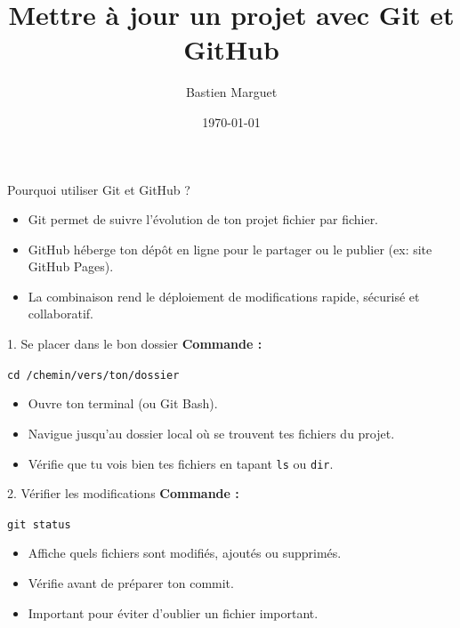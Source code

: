 \documentclass{beamer}
\title{Mettre à jour un projet avec Git et GitHub}
\author{Bastien Marguet}
\date{\today}
\begin{document}
	
	\begin{frame}
		\titlepage
	\end{frame}
	
	\begin{frame}{Pourquoi utiliser Git et GitHub ?}
		\begin{itemize}
			\item Git permet de suivre l’évolution de ton projet fichier par fichier.
			\item GitHub héberge ton dépôt en ligne pour le partager ou le publier (ex: site GitHub Pages).
			\item La combinaison rend le déploiement de modifications rapide, sécurisé et collaboratif.
		\end{itemize}
	\end{frame}
	
	\begin{frame}{1. Se placer dans le bon dossier}
		\textbf{Commande :}
		\begin{block}{}
			\texttt{cd /chemin/vers/ton/dossier}
		\end{block}
		\begin{itemize}
			\item Ouvre ton terminal (ou Git Bash).
			\item Navigue jusqu’au dossier local où se trouvent tes fichiers du projet.
			\item Vérifie que tu vois bien tes fichiers en tapant \texttt{ls} ou \texttt{dir}.
		\end{itemize}
	\end{frame}
	
	\begin{frame}{2. Vérifier les modifications}
		\textbf{Commande :}
		\begin{block}{}
			\texttt{git status}
		\end{block}
		\begin{itemize}
			\item Affiche quels fichiers sont modifiés, ajoutés ou supprimés.
			\item Vérifie avant de préparer ton commit.
			\item Important pour éviter d’oublier un fichier important.
		\end{itemize}
	\end{frame}
	
\end{document}
